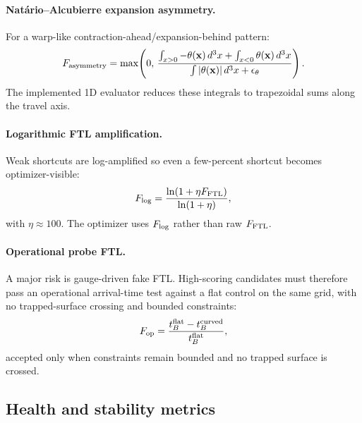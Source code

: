 \documentclass[twocolumn,floatfix,aps,prd,nofootinbib]{revtex4-2}
\begin{document}
\paragraph{Nat\'{a}rio--Alcubierre expansion asymmetry.}
For a warp-like contraction-ahead/expansion-behind pattern:
\begin{equation}
    F_{\rm asymmetry} = \max\!\left(0,\, \frac{\int_{x > 0} -\theta(\mathbf{x})\,d^3x + \int_{x < 0} \theta(\mathbf{x})\,d^3x}{\int |\theta(\mathbf{x})|\,d^3x + \epsilon_{\theta}} \right).
\end{equation}
The implemented 1D evaluator reduces these integrals to trapezoidal sums along the travel axis.

\paragraph{Logarithmic FTL amplification.}
Weak shortcuts are log-amplified so even a few-percent shortcut becomes optimizer-visible:
\begin{equation}
    F_{\rm log} = \frac{\ln(1 + \eta F_{\rm FTL})}{\ln(1 + \eta)},
    \label{eq:f_log}
\end{equation}
with $\eta\approx100$.  The optimizer uses $F_{\rm log}$ rather than raw $F_{\rm FTL}$.

\paragraph{Operational probe FTL.}
A major risk is gauge-driven fake FTL.  High-scoring candidates must therefore pass an operational arrival-time test against a flat control on the same grid, with no trapped-surface crossing and bounded constraints:
\begin{equation}
    F_{\rm op} = \frac{t_B^{\rm flat} - t_B^{\rm curved}}{t_B^{\rm flat}},
    \label{eq:f_op}
\end{equation}
accepted only when constraints remain bounded and no trapped surface is crossed.

\subsection{Health and stability metrics}
\end{document}

